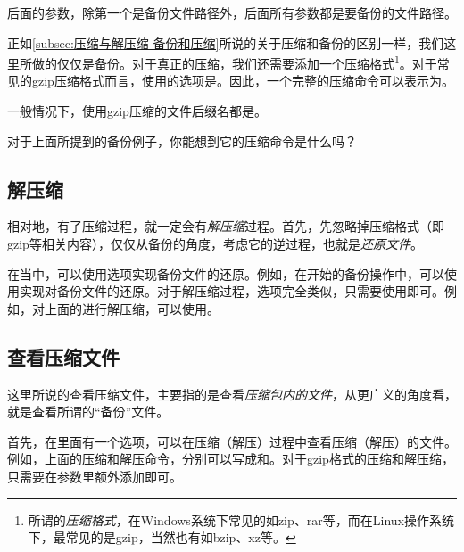 \begin{attention}
    后面的参数，除第一个是备份文件路径外，后面所有参数都是要备份的文件路径。
\end{attention}

正如\ref{subsec:压缩与解压缩-备份和压缩}所说的关于压缩和备份的区别一样，我们这里所做的仅仅是备份。对于真正的压缩，我们还需要添加一个压缩格式\footnote{所谓的\emph{压缩格式}，在Windows系统下常见的如zip、rar等，而在Linux操作系统下，最常见的是gzip，当然也有如bzip、xz等。}。对于常见的gzip压缩格式而言，使用的选项是。因此，一个完整的压缩命令可以表示为。

\begin{attention}
    一般情况下，使用gzip压缩的文件后缀名都是。
\end{attention}

对于上面所提到的备份例子，你能想到它的压缩命令是什么吗？


\subsection{解压缩}\label{subsec:压缩与解压缩-解压缩}

相对地，有了压缩过程，就一定会有\emph{解压缩}过程。首先，先忽略掉压缩格式（即gzip等相关内容），仅仅从备份的角度，考虑它的逆过程，也就是\emph{还原文件}。

在当中，可以使用选项实现备份文件的还原。例如，在开始的备份操作中，可以使用实现对备份文件的还原。对于解压缩过程，选项完全类似，只需要使用即可。例如，对上面的进行解压缩，可以使用。

\subsection{查看压缩文件}\label{subsec:压缩与解压缩-查看压缩文件}

这里所说的查看压缩文件，主要指的是查看\emph{压缩包内的文件}，从更广义的角度看，就是查看所谓的“备份”文件。

首先，在里面有一个选项，可以在压缩（解压）过程中查看压缩（解压）的文件。例如，上面的压缩和解压命令，分别可以写成和。对于gzip格式的压缩和解压缩，只需要在参数里额外添加即可。

